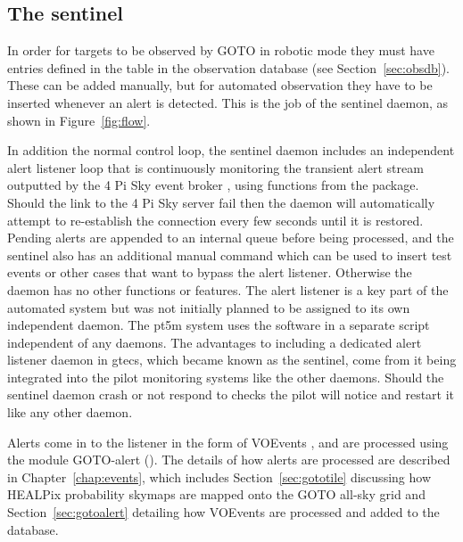 \begin{colsection}

\subsection{The sentinel}
\label{sec:sentinel}
\begin{colsection}

In order for targets to be observed by GOTO in robotic mode they must have entries defined in the  table in the observation database (see Section~\ref{sec:obsdb}). These can be added manually, but for automated observation they have to be inserted whenever an alert is detected. This is the job of the sentinel daemon, as shown in Figure~\ref{fig:flow}.

In addition the normal control loop, the sentinel daemon includes an independent alert listener loop that is continuously monitoring the transient alert stream outputted by the 4 Pi Sky event broker \citep{4pisky}, using functions from the   package. Should the link to the 4 Pi Sky server fail then the daemon will automatically attempt to re-establish the connection every few seconds until it is restored. Pending alerts are appended to an internal queue before being processed, and the sentinel also has an additional manual  command which can be used to insert test events or other cases that want to bypass the alert listener. Otherwise the daemon has no other functions or features. The alert listener is a key part of the automated system but was not initially planned to be assigned to its own independent daemon. The \gls{pt5m} system uses the  software \citep{comet} in a separate script independent of any daemons. The advantages to including a dedicated alert listener daemon in \gls{gtecs}, which became known as the sentinel, come from it being integrated into the pilot monitoring systems like the other daemons. Should the sentinel daemon crash or not respond to checks the pilot will notice and restart it like any other daemon.

Alerts come in to the listener in the form of VOEvents \citep{voevent}, and are processed using the  module GOTO-alert (). The details of how alerts are processed are described in Chapter~\ref{chap:events}, which includes Section~\ref{sec:gototile} discussing how HEALPix probability skymaps are mapped onto the GOTO all-sky grid and Section~\ref{sec:gotoalert} detailing how VOEvents are processed and added to the database.


\end{colsection}
\end{colsection}
